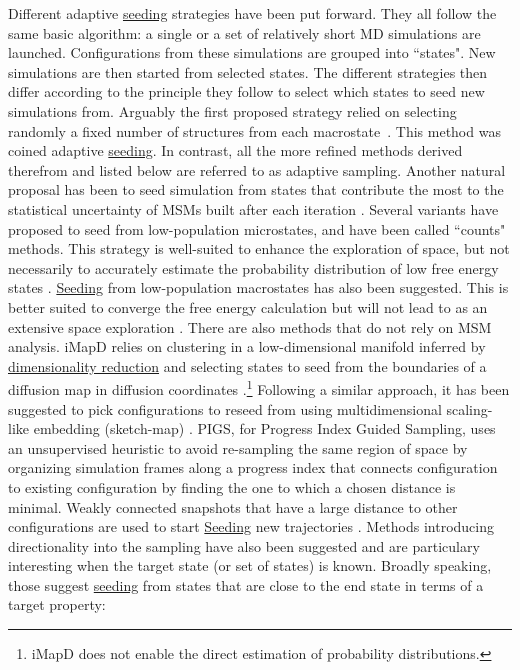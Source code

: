 \documentclass[9pt,review]{livecoms}
\begin{document}
Different adaptive \hyperlink{ref:Seeding} {seeding} strategies have been put forward. They all follow the same basic algorithm: a single or a set of relatively short MD simulations are launched. Configurations from these simulations are grouped into ``states". New simulations are then started from selected states. The different strategies then differ according to the principle they follow to select which states to seed new simulations from.
Arguably the first proposed strategy relied on selecting randomly a fixed number of structures from each macrostate~\cite{doi:10.1063/1.2740261,Huang19765,doi:10.1021/ct900620b}. This method was coined adaptive \hyperlink{ref:Seeding} {seeding}. In contrast, all the more refined methods derived therefrom and listed below are referred to as adaptive sampling. Another natural proposal has been to seed simulation from states that contribute the most to the statistical uncertainty of MSMs built after each iteration \cite{doi:10.1021/ct500827g}. Several variants have proposed to seed from low-population microstates, and have been called ``counts" methods. This strategy is well-suited to enhance the exploration of space, but not necessarily to accurately estimate the probability distribution of low free energy states \cite{doi:10.1021/ct2004484,doi:10.1021/ct400919u,lecina_adaptive_2017,shamsi_enhanced_2017,6114444}. \hyperlink{ref:Seeding} {Seeding} from low-population macrostates has also been suggested. This is better suited to converge the free energy calculation but will not lead to as an extensive space exploration \cite{doi:10.1021/acs.jctc.6b00762,doi:10.1063/1.5053582}. There are also methods that do not rely on MSM analysis. iMapD relies on clustering in a low-dimensional manifold inferred by \hyperlink{ref:DimRed} {dimensionality reduction} and selecting states to seed from the boundaries of a diffusion map in diffusion coordinates \cite{ChiavazzoE5494}.\footnote{iMapD does not enable the direct estimation of probability distributions.} Following a similar approach, it has been suggested to pick configurations to reseed from using multidimensional scaling-like embedding (sketch-map) \cite{doi:10.1021/acs.jctc.6b00503}. PIGS, for Progress Index Guided Sampling, uses an unsupervised heuristic to avoid re-sampling the same region of space by organizing simulation frames along a progress index that connects configuration to existing configuration by finding the one to which a chosen distance is minimal. Weakly connected snapshots that have a large distance to other configurations are used to start \hyperlink{ref:Seeding} {Seeding} new trajectories \cite{BACCI2015889}. Methods introducing directionality into the sampling have also been suggested and are particulary interesting when the target state (or set of states) is known. Broadly speaking, those suggest \hyperlink{ref:Seeding} {seeding} from states that are close to the end state in terms of a target property:
\end{document}
